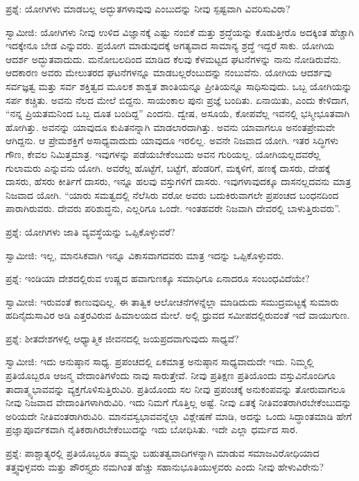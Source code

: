 ಪ್ರಶ್ನೆ: ಯೋಗಿಗಳು ಮಾಡಬಲ್ಲ ಅದ್ಭುತಗಳಾವುವು ಎಂಬುದನ್ನು ನೀವು ಸ್ಪಷ್ಟವಾಗಿ ವಿವರಿಸುವಿರಾ?

ಸ್ವಾಮೀಜಿ: ಯೋಗಿಗಳು ನೀವು ಉಳಿದ ವಿಜ್ಞಾನಕ್ಕೆ ಎಷ್ಟು ನಂಬಿಕೆ ಮತ್ತು ಶ್ರದ್ಧೆಯನ್ನು ಕೊಡುತ್ತೀರೊ ಅದಕ್ಕಿಂತ ಹೆಚ್ಚಾಗಿ ಇದಕ್ಕೇನೂ ಬೇಡ ಎನ್ನುವರು. ಪ್ರಯೋಗ ಮಾಡುವುದಕ್ಕೆ ಅಗತ್ಯವಾದ ಸಾಮಾನ್ಯ ಶ್ರದ್ಧೆ ಇದ್ದರೆ ಸಾಕು. ಯೋಗಿಯ ಆದರ್ಶ ಅದ್ಭುತವಾದುದು. ಮನೋಬಲದಿಂದ ಮಾಡಿದ ಕೆಲವು ಕೆಳಮಟ್ಟದ ಘಟನೆಗಳನ್ನು ನಾನು ನೋಡಿರುವೆನು. ಆದಕಾರಣ ಅವರು ಮೇಲುತರದ ಘಟನೆಗಳನ್ನೂ ಮಾಡಬಲ್ಲರೆಂಬುದನ್ನು ನಂಬುವೆನು. ಯೋಗಿಯ ಆದರ್ಶವು ಸರ್ವಜ್ಞತ್ವ ಮತ್ತು ಸರ್ವ ಶಕ್ತಿತ್ವದ ಮೂಲಕ ಶಾಶ್ವತ ಶಾಂತಿಯನ್ನೂ ಪ್ರೀತಿಯನ್ನೂ ಸಾಧಿಸುವುದು. ಒಬ್ಬ ಯೋಗಿಯನ್ನು ಸರ್ಪ ಕಚ್ಚಿತು. ಅವನು ನೆಲದ ಮೇಲೆ ಬಿದ್ದನು. ಸಾಯಂಕಾಲ ಪುನಃ ಪ್ರಜ್ಞೆ ಬಂದಿತು. ಏನಾಯಿತು, ಎಂದು ಕೇಳಿದಾಗ, “ನನ್ನ ಪ್ರಿಯತಮನಿಂದ ಒಬ್ಬ ದೂತ ಬಂದಿದ್ದ” ಎಂದನು. ದ್ವೇಷ, ಅಸೂಯೆ, ಕೋಪವೆಲ್ಲ ಇವನಲ್ಲಿ ಭಸ್ಮೀಭೂತವಾಗಿ ಹೋಗಿತ್ತು. ಅವನನ್ನು ಯಾವುದೂ ಕುಪಿತನನ್ನಾಗಿ ಮಾಡಲಾರದಾಗಿತ್ತು. ಅವನು ಯಾವಾಗಲೂ ಅನಂತಪ್ರೇಮವೇ ಆಗಿದ್ದನು. ಆ ಪ್ರೇಮಶಕ್ತಿಗೆ ಅಸಾಧ್ಯವಾದುದು ಯಾವುದೂ ಇರಲಿಲ್ಲ. ಅವನೇ ನಿಜವಾದ ಯೋಗಿ. ಇತರ ಸಿದ್ಧಿಗಳು ಗೌಣ, ಕೇವಲ ನಿಮಿತ್ತಮಾತ್ರ. ಇವುಗಳನ್ನು ಪಡೆಯಬೇಕೆಂಬುದು ಅವನ ಗುರಿಯಲ್ಲ. ಯೋಗಿಯಲ್ಲದವರೆಲ್ಲ ಗುಲಾಮರು ಎನ್ನುವನು ಯೋಗಿ. ಅವರೆಲ್ಲ ಹೊಟ್ಟೆಗೆ, ಬಟ್ಟೆಗೆ, ಹೆಂಡರಿಗೆ, ಮಕ್ಕಳಿಗೆ, ಹಣಕ್ಕೆ ದಾಸರು, ದೇಹಕ್ಕೆ ದಾಸರು, ಹೆಸರು ಕೀರ್ತಿಗೆ ದಾಸರು, ಇನ್ನೂ ಹಲವು ವಸ್ತುಗಳಿಗೆ ದಾಸರು. ಇವುಗಳಾವುದಕ್ಕೂ ದಾಸನಲ್ಲದವನು ಮಾತ್ರ ನಿಜವಾದ ಯೋಗಿ. “ಯಾರು ಸಮತ್ವದಲ್ಲಿ ನೆಲೆಸಿರು ವರೋ ಅವರು ಬದುಕಿರುವಾಗಲೇ ಪ್ರಪಂಚದ ಬಂಧನದಿಂದ ಪಾರಾಗಿರುವರು. ದೇವರು ಪರಿಶುದ್ಧನು, ಎಲ್ಲರಿಗೂ ಒಂದೇ. ಇಂತಹವರೇ ನಿಜವಾಗಿ ದೇವರಲ್ಲಿ ಬಾಳುತ್ತಿರುವರು”.

ಪ್ರಶ್ನೆ: ಯೋಗಿಗಳು ಜಾತಿ ವ್ಯವಸ್ಥೆಯನ್ನು ಒಪ್ಪಿಕೊಳ್ಳುವರೆ?

ಸ್ವಾಮೀಜಿ: ಇಲ್ಲ, ಮಾನಸಿಕವಾಗಿ ಇನ್ನೂ ವಿಕಾಸವಾಗದವರು ಮಾತ್ರ ಇದನ್ನು ಒಪ್ಪಿಕೊಳ್ಳುವರು.

ಪ್ರಶ್ನೆ: ಇಂಡಿಯಾ ದೇಶದಲ್ಲಿರುವ ಉಷ್ಣದ ಹವಾಗುಣಕ್ಕೂ ಸಮಾಧಿಗೂ ಏನಾದರೂ ಸಂಬಂಧವಿದೆಯೇ?

ಸ್ವಾಮೀಜಿ: ಇರುವಂತೆ ಕಾಣುವುದಿಲ್ಲ. ಈ ತಾತ್ವಿಕ ಆಲೋಚನೆಗಳನ್ನೆಲ್ಲಾ ಮಾಡಿದುದು ಸಮುದ್ರಮಟ್ಟಕ್ಕೆ ಸುಮಾರು ಹದಿನೈದುಸಾವಿರ ಅಡಿ ಎತ್ತರವಿರುವ ಹಿಮಾಲಯದ ಮೇಲೆ. ಅಲ್ಲಿ ಧ್ರುವದ ಸಮೀಪದಲ್ಲಿರುವಂತೆ ಇದೆ ವಾಯುಗುಣ.

ಪ್ರಶ್ನೆ: ಶೀತದೇಶಗಳಲ್ಲಿ ಆಧ್ಯಾತ್ಮಿಕ ಜೀವನದಲ್ಲಿ ಜಯಪ್ರದವಾಗುವುದು ಸಾಧ್ಯವೆ?

ಸ್ವಾಮೀಜಿ: ಇದು ಅನುಷ್ಠಾನ ಸಾಧ್ಯ. ಪ್ರಪಂಚದಲ್ಲಿ ಏಕಮಾತ್ರ ಅನುಷ್ಠಾನ ಸಾಧ್ಯವಾದುದೇ ಇದು. ನಿಮ್ಮಲ್ಲಿ ಪ್ರತಿಯೊಬ್ಬರೂ ಆಜನ್ಮ ವೇದಾಂತಿಗಳೆಂದು ನಾವು ಸಾರುತ್ತೇವೆ. ನೀವು ಪ್ರತಿಕ್ಷಣ ಪ್ರತಿಯೊಂದು ವಸ್ತುವಿನೊಂದಿಗೂ ತಾದಾತ್ಮ್ಯಭಾವವನ್ನು ವ್ಯಕ್ತಗೊಳಿಸುತ್ತಿರುವಿರಿ. ಪ್ರತಿಯೊಂದು ಸಲ ನೀವು ಪ್ರಪಂಚಕ್ಕೆ ಅನುಕಂಪವನ್ನು ತೋರುವಾಗಲೂ ನೀವು ನಿಜವಾದ ವೇದಾಂತಿಗಳಾಗಿರುವಿರಿ. ಇದು ನಿಮಗೆ ಗೊತ್ತಿಲ್ಲ ಅಷ್ಟೆ. ನೀವು ಏತಕ್ಕೆ ನೀತಿವಂತರಾಗಿರಬೇಕೆಂಬುದನ್ನು ಅರಿಯದೇ ನೀತಿವಂತರಾಗಿರುವಿರಿ. ಮಾನವಸ್ವಭಾವವನ್ನೆಲ್ಲಾ ವಿಶ್ಲೇಷಣೆ ಮಾಡಿ, ಅದನ್ನು ಒಂದು ಸಿದ್ಧಾಂತಮಾಡಿ ಹೇಗೆ ಪ್ರಜ್ಞಾಪೂರ್ವಕವಾಗಿ ನೈತಿಕರಾಗಿರಬೇಕೆಂಬುದನ್ನು ಇದು ಬೋಧಿಸಿತು. ಇದೇ ಎಲ್ಲಾ ಧರ್ಮದ ಸಾರ.

ಪ್ರಶ್ನೆ: ಪಾಶ್ಚಾತ್ಯರಲ್ಲಿ ಪ್ರತಿಯೊಬ್ಬರೂ ತಮ್ಮನ್ನು ಬಹುತತ್ವವಾದಿಗಳನ್ನಾಗಿ ಮಾಡುವ ಸಮಾಜವಿರೋಧಿಯಾದ ತತ್ತ್ವವುಳ್ಳವರು ಮತ್ತು ಪೌರಸ್ತ್ಯರು ನಮಗಿಂತ ಹೆಚ್ಚು ಸಹಾನುಭೂತಿಯುಳ್ಳವರು ಎಂದು ನೀವು ಹೇಳುವಿರೇನು?

